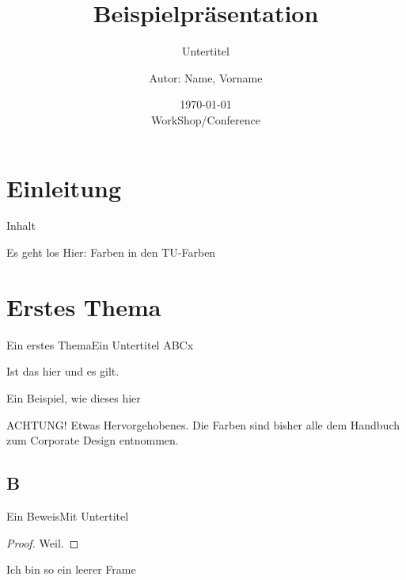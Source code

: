 \documentclass[german,10pt,xcolor=colortbl,compress
]{beamer}
\title{Beispielpräsentation}
\subtitle{Untertitel}
\date[]{\today\\[1ex] WorkShop/Conference}
\author[Autor in Fußzeile]{Autor: Name, Vorname}
\institute[]{AG xy\\FB ab\\TU Kaiserslautern}
\begin{document}
	\maketitle	
	\section{Einleitung}
	\begin{frame}{Inhalt}
		\tableofcontents
	\end{frame}
	\begin{frame}{Es geht los}
		Hier: Farben in den TU-Farben
	\end{frame}
	\section{Erstes Thema}
	\begin{frame}{Ein erstes Thema}{Ein Untertitel}
	ABCx
	\begin{lemma}
		Ist das hier und es gilt.
	\end{lemma}
	\begin{example}
		Ein Beispiel, wie dieses hier
	\end{example}
	\alert{ACHTUNG!}
		Etwas Hervorgehobenes. Die Farben sind bisher alle dem Handbuch zum Corporate Design entnommen.
	\end{frame}
	\subsection{B}
	\begin{frame}{Ein Beweis}{Mit Untertitel}
			\begin{proof}
				Weil.
			\end{proof}
	\end{frame}
	\begin{frame}[plain]{}{}%
		Ich bin so ein leerer Frame
	\end{frame}
\end{document}
